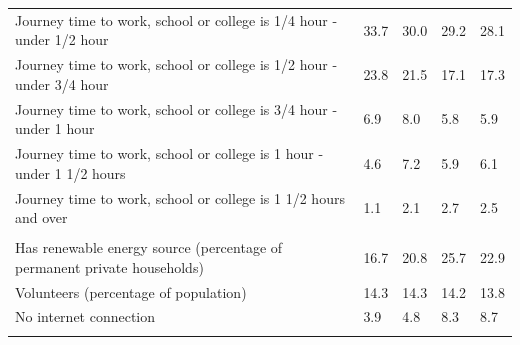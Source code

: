 \documentclass{article}
\begin{document}
\begin{table}[h]
\begin{tabular}{KTTTT}
Journey time to work, school or college is 1/4 hour - under 1/2 hour & 33.7& 30.0& 29.2& 28.1\\
Journey time to work, school or college is 1/2 hour - under 3/4 hour & 23.8& 21.5& 17.1& 17.3\\
Journey time to work, school or college is 3/4 hour - under 1 hour & 6.9& 8.0& 5.8& 5.9\\
Journey time to work, school or college is 1 hour - under 1 1/2 hours & 4.6& 7.2& 5.9& 6.1\\
Journey time to work, school or college is 1 1/2 hours and over & 1.1& 2.1& 2.7& 2.5\\
\hline
    \\ 
    \hline
Has renewable energy source (percentage of permanent private households) & 16.7& 20.8& 25.7& 22.9\\
    \hline
Volunteers (percentage of population) & 14.3& 14.3& 14.2& 13.8\\
    \hline
No internet connection& 3.9& 4.8& 8.3& 8.7\\
\hline
\end{tabular}
\end{table}
\end{document}
